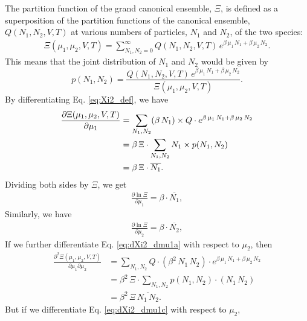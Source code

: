 \documentclass[twocolumn, 10pt]{article}
\numberwithin{equation}{section}
\newenvironment{solution}[1][\empty]
{\par\medskip
  \textbf{\ifx\empty#1{Solution.}\relax\else{#1}\fi} \ignorespaces}
{\medskip}
\begin{document}
\begin{solution}
The partition function of the grand canonical ensemble, $\Xi$,
is defined as a superposition of
the partition functions of the canonical ensemble, $Q(N_1, N_2, V, T)$
at various numbers of particles, $N_1$ and $N_2$,
of the two species:
\begin{align}
\Xi(\mu_1, \mu_2, V, T)
=
\sum_{N_1, N_2=0}^\infty
  Q(N_1, N_2, V, T) \,
  e^{\beta \, \mu_1 \, N_1 + \beta \, \mu_2 \, N_2}.
\label{eq:Xi2_def}
\end{align}
%
This means that the joint distribution of $N_1$ and $N_2$
would be given by
$$
p(N_1, N_2) = \frac{ Q(N_1, N_2, V, T) \, e^{\beta \, \mu_1 \, N_1 + \beta \, \mu_2 \, N_2} }
                   { \Xi(\mu_1, \mu_2, V, T) }.
$$
By differentiating Eq. \eqref{eq:Xi2_def},
we have
\begin{align}
  \frac{ \partial \Xi(\mu_1, \mu_2, V, T) }
       { \partial \mu_1 }
  &=
  \sum_{N_1, N_2}
    (\beta \, N_1) \times Q \cdot
    e^{\beta \, \mu_1 \, N_1 + \beta \, \mu_2 \, N_2}
  \label{eq:dXi2_dmu1a}
  \\
  &=
    \beta \, \Xi \cdot
    \sum_{N_1, N_2}
    N_1 \times p(N_1, N_2)
  \notag
  \\
  &=
    \beta \, \Xi \cdot
    \overline{ N_1 }
  .
  \label{eq:dXi2_dmu1c}
\end{align}
%
Dividing both sides by $\Xi$, we get
%
\begin{align*}
  \frac{ \partial \ln \Xi } { \partial \mu_1 }
  = \beta \cdot \overline{ N_1 },
\end{align*}
%
Similarly, we have
\begin{align}
  \frac{ \partial \ln \Xi } { \partial \mu_2 }
  = \beta \cdot \overline{ N_2 },
  \label{eq:dlnXi2_dmu2}
\end{align}
%
If we further differentiate Eq. \eqref{eq:dXi2_dmu1a}
with respect to $\mu_2$, then
\begin{align*}
  \frac{ \partial^2 \Xi(\mu_1, \mu_2, V, T) }
       { \partial \mu_1 \partial \mu_2 }
  &=
  \sum_{N_1, N_2}
    Q \cdot (\beta^2 \, N_1 \, N_2) \cdot
    e^{\beta \, \mu_1 \, N_1 + \beta \, \mu_2 \, N_2}
  \\
  &=
    \beta^2 \, \Xi \cdot
    \sum_{N_1, N_2}
    p(N_1, N_2) \cdot (N_1 \, N_2)
  \\
  &=
  \beta^2 \, \Xi \, \overline{ N_1 \, N_2 }
  .
\end{align*}
%
But if we differentiate Eq. \eqref{eq:dXi2_dmu1c}
with respect to $\mu_2$,
\begin{align*}

\end{align*}
\end{solution}
\end{document}
